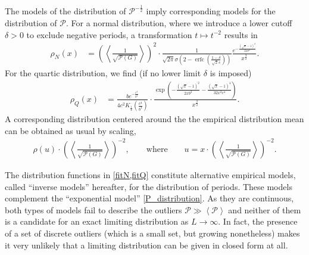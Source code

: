 \documentclass[12pt,a4paper]{article}
\newcommand{\period}{\mathcal P}
\renewcommand{\|}{\rule[-0.4ex]{0.2ex}{1.2em}}
\begin{document}
The models of the distribution of $\period^{-\frac 12}$ imply   corresponding models for the distribution of $\period$. For a normal distribution, where we introduce a lower cutoff $\delta >0$ to exclude negative periods,  a transformation $t \mapsto t^{-2}$ results in
\begin{align}\label{fitN}
	\rho_N(x) &=\left(\left \langle \frac{1}{\sqrt {\period (G)}} \right \rangle \right)^2\cdot  \frac{1}{\sqrt{2\pi} \sigma \left( 2-\operatorname{erfc}\left( \frac{1-\delta }{\sqrt 2 s} \right)   \right)  } \frac{e^{- \frac{\left( \sqrt x-1 \right) ^2}{2 x \sigma^2} }}{ x^{\frac 32}} .
\end{align}
For the quartic distribution, we find (if no lower limit  $\delta$ is imposed) 
\begin{align}\label{fitQ}
	\rho_Q(x) &= \frac{b e^{-\frac{c^4}{b^4}}}{4c^2 K_{\frac 14} \left( \frac{c^4}{b^4} \right)  } \cdot\frac{\exp \left( - \frac{(\sqrt x-1)^2}{2xb^2}  - \frac{(\sqrt x-1)^4}{32 x^2c^4} \right)}{x^{\frac 32}}.
\end{align}
A corresponding distribution centered around the the empirical distribution mean can be obtained as usual by scaling,
\begin{align}\label{fitQ_scaling}
	\rho(u)\cdot \left(\left \langle \frac{1}{\sqrt {\period (G)}} \right \rangle \right)^{-2} , \qquad \text{where} \qquad u= x\cdot  \left(\left \langle \frac{1}{\sqrt {\period (G)}} \right \rangle \right)^{-2} .
\end{align}

The distribution functions in  \cref{fitN,fitQ} constitute   alternative empirical models, called \enquote{inverse models} hereafter, for the distribution of periods. These models complement the \enquote{exponential model} \cref{P_distribution}. 
As they are continuous, both types of models fail to describe the outliers $\period \gg \left \langle \period \right \rangle $ and neither of them is a candidate for an exact limiting distribution as $L \rightarrow \infty$. In fact, the presence of a set of discrete outliers (which is a small set, but growing nonetheless) makes it very unlikely that a limiting distribution can be given in closed form at all.
\end{document}
